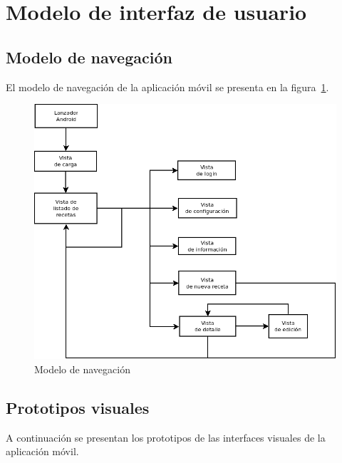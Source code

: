 \section{Modelo de interfaz de usuario}

\subsection{Modelo de navegación}

El modelo de navegación de la aplicación móvil se presenta en la
figura~\ref{fig:modelo-navegacion}.

\begin{figure}[hp]
  \centering
  \includegraphics[width=\textwidth]{cap4/img/diagrama_navegacion}
  \caption{Modelo de navegación}
  \label{fig:modelo-navegacion}
\end{figure}


\subsection{Prototipos visuales}

A continuación se presentan los prototipos de las interfaces visuales de la
aplicación móvil.

